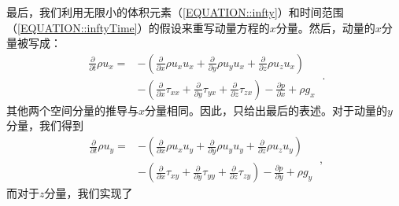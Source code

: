 \documentclass[MathematicsNumericsDerivationsAndOpenFOAM.tex]{subfiles}
\begin{document}
%
%
	最后，我们利用无限小的体积元素（\ref{EQUATION::infty}）和时间范围（\ref{EQUATION::inftyTime}）的假设来重写动量方程的$x$分量。然后，动量的$x$分量被写成：
%
%
\begin{equation}\boxed{\begin{aligned}
  \frac{\partial}{\partial t} \rho u_x
=
 &-\left(
      \frac{\partial}{\partial x} \rho u_x u_x
      +\frac{\partial}{\partial y} \rho u_y u_x
      +\frac{\partial}{\partial z} \rho u_z u_x
  \right)\\
 &-\left(
      \frac{\partial}{\partial x}  \tau_{xx}
      +\frac{\partial}{\partial y}  \tau_{yx}
      +\frac{\partial}{\partial z}  \tau_{zx}
  \right)
  -
  \frac{\partial p}{\partial x}
  +
  \rho g_x
  \label{EQUATION::momentumX}
\end{aligned}} ~.\end{equation}
%
%
    其他两个空间分量的推导与$x$分量相同。因此，只给出最后的表述。对于动量的$y$分量，我们得到
%
%
\begin{equation}\boxed{\begin{aligned}
  \frac{\partial}{\partial t} \rho u_y
=
 &-\left(
      \frac{\partial}{\partial x} \rho u_x u_y
      +\frac{\partial}{\partial y} \rho u_y u_y
      +\frac{\partial}{\partial z} \rho u_z u_y
  \right)\\
 &-\left(
      \frac{\partial}{\partial x}  \tau_{xy}
      +\frac{\partial}{\partial y}  \tau_{yy}
      +\frac{\partial}{\partial z}  \tau_{zy}
  \right)
  -
  \frac{\partial p}{\partial y}
  +
  \rho g_y
  \label{EQUATION::momentumY}
\end{aligned}}~,
\end{equation}
%
%
	而对于$z$分量，我们实现了
%
%
\end{document}
